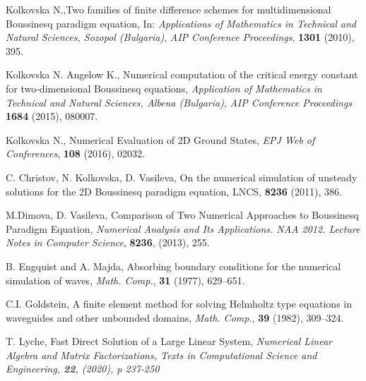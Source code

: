 \documentclass{article}
\begin{document}
\begin{thebibliography}{99}
 Kolkovska N.,Two families of finite difference schemes for multidimensional Boussinesq paradigm equation, In:
{\it Applications of Mathematics in Technical and Natural Sciences,  Sozopol (Bulgaria)},
\emph{AIP Conference Proceedings}, \textbf{1301} (2010), 395.

 Kolkovska N. Angelow K., Numerical computation of the critical energy constant for two-dimensional Boussinesq equations,
{\it Application of Mathematics in Technical and Natural Sciences, Albena (Bulgaria)},
\emph{AIP Conference Proceedings}  \textbf{1684} (2015), 080007.

 Kolkovska N., Numerical Evaluation of 2D Ground States,
\emph{ EPJ Web of Conferences}, \textbf{108} (2016), 02032.

C. Christov, N. Kolkovska, D. Vasileva, On the numerical simulation of unsteady solutions for the 2D Boussinesq paradigm equation, LNCS, \textbf{8236}  (2011), 386.

M.Dimova, D. Vasileva, Comparison of Two Numerical Approaches to Boussinesq Paradigm Equation, 
{\it Numerical Analysis and Its Applications. NAA 2012. Lecture Notes in Computer Science}, \textbf{8236}, (2013), 255.

 B. Engquist and A. Majda, Absorbing boundary conditions for the numerical simulation of waves, {\it Math. Comp.}, \textbf{31} (1977), 629–651.

  C.I. Goldstein, A finite element method for solving Helmholtz type equations in waveguides and other unbounded domains,
{\it Math. Comp.}, \textbf{39} (1982), 309–324.

 T. Lyche, Fast Direct Solution of a Large Linear System,
\it{Numerical Linear Algebra and Matrix Factorizations, Texts in Computational Science and Engineering}, \textbf{22}, (2020), p 237-250 

\end{thebibliography}
\end{document}
